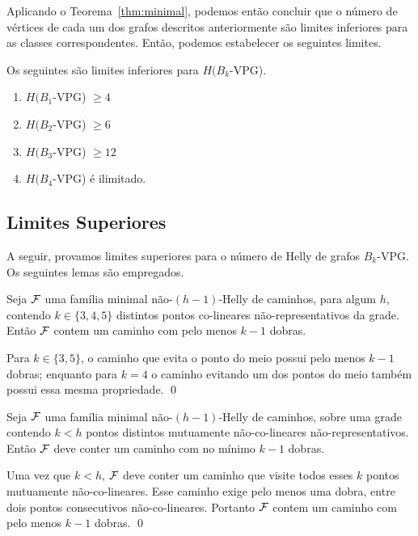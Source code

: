 Aplicando o Teorema~\ref{thm:minimal}, podemos então concluir que o número de vértices de cada um dos grafos descritos anteriormente são limites inferiores para as classes correspondentes. Então, podemos estabelecer os seguintes limites.

\begin{lema}\label{claim:VPG-lower}
Os seguintes são limites inferiores para $H(B_k$-VPG).
\begin{enumerate}
\item $H(B_1$-VPG) $\geq 4$
\item $H(B_2$-VPG) $\geq 6$
\item $H(B_3$-VPG) $\geq 12$
\item $H(B_4$-VPG) é ilimitado.
\end{enumerate}
\end{lema}

\subsection{Limites Superiores}

A seguir, provamos limites superiores para o número de Helly de grafos $B_k$-VPG. Os seguintes lemas são empregados.

\begin{lemma}\label{column-sizes}
Seja $\cal F$ uma família minimal não-$(h-1)$-Helly de caminhos, para algum $h$, contendo $k \in \{3,4,5\}$ distintos pontos co-lineares não-representativos da grade. Então $\cal F$ contem um caminho com pelo menos $k-1$ dobras.
\end{lemma}

\proof Para $k \in \{3,5\}$, o caminho que evita o ponto do meio possui pelo menos $k-1$ dobras; enquanto para $k = 4$ o caminho evitando um dos pontos do meio também possui essa mesma propriedade.
\qed

\begin{lemma}\label{column-number}
Seja $\cal F$ uma família minimal não-$(h-1)$-Helly de caminhos, sobre uma grade contendo $k < h$ pontos distintos mutuamente não-co-lineares não-representativos. Então $\cal F$ deve conter um caminho com no mínimo $k-1$ dobras.
\end{lemma}   

\proof Uma vez que $k < h$, $\cal F$ deve conter um caminho que visite todos esses $k$ pontos mutuamente não-co-lineares. Esse caminho exige pelo menos uma dobra, entre dois pontos consecutivos não-co-lineares. Portanto $\cal F$ contem um caminho com pelo menos $k-1$ dobras. \qed \\

